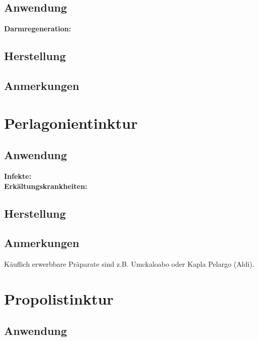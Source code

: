 \subsection{Anwendung}

\textbf{Darmregeneration:} \\ 

\subsection{Herstellung}

\subsection{Anmerkungen}






\section{Perlagonientinktur}

\subsection{Anwendung}

\textbf{Infekte:} \\ 

\textbf{Erkältungskrankheiten:} \\ 


\subsection{Herstellung}

\subsection{Anmerkungen}

Käuflich erwerbbare Präparate sind z.B. Umckaloabo oder Kapla Pelargo (Aldi).






\section{Propolistinktur}

\subsection{Anwendung}


